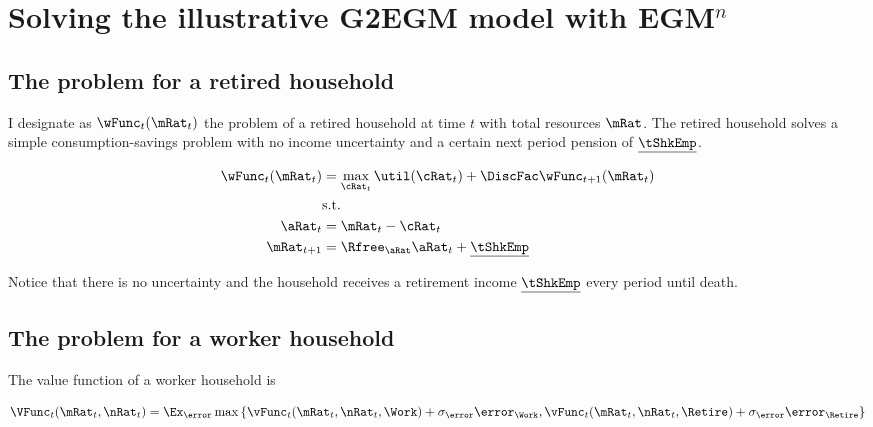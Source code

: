 \documentclass[\econtexRoot/SequentialEGM]{subfiles}
\begin{document}

\hypertarget{Appendices}{} %

\hypertarget{Estimating-discount-factor-distributions-for-different-interest-rates}{}\par\section{Solving the illustrative G2EGM model with EGM$^n$}
\notinsubfile{\label{app:DF_R}}

\subsection{The problem for a retired household}

I designate as $\wFunc_{t}(\mRat_{t})$ the problem of a retired household at time $t$ with total resources $\mRat$. The retired household solves a simple consumption-savings problem with no income uncertainty and a certain next period pension of $\underline{\tShkEmp}$.

\begin{equation}
	\begin{split}
		\wFunc_{t}(\mRat_{t}) & = \max_{\cRat_{t}} \util(\cRat_{t}) +
		\DiscFac \wFunc_{t+1}(\mRat_{t}) \\
		& \text{s.t.} \\
		\aRat_{t} & = \mRat_{t} - \cRat_{t} \\
		\mRat_{t+1} & = \Rfree_{\aRat} \aRat_{t} +
		\underline{\tShkEmp}
	\end{split}
\end{equation}

Notice that there is no uncertainty and the household receives a retirement
income $\underline{\tShkEmp}$ every period until death.

\subsection{The problem for a worker household}

The value function of a worker household is

\p

\begin{equation}
	\VFunc_{t}(\mRat_{t}, \nRat_{t}) = \Ex_\error \max \left\{
	\vFunc_{t}(\mRat_{t}, \nRat_{t}, \Work) + \sigma_{\error}
	\error_{\Work} ,
	\vFunc_{t}(\mRat_{t}, \nRat_{t}, \Retire) + \sigma_{\error}
	\error_{\Retire} \right\}
\end{equation}
\end{document}
